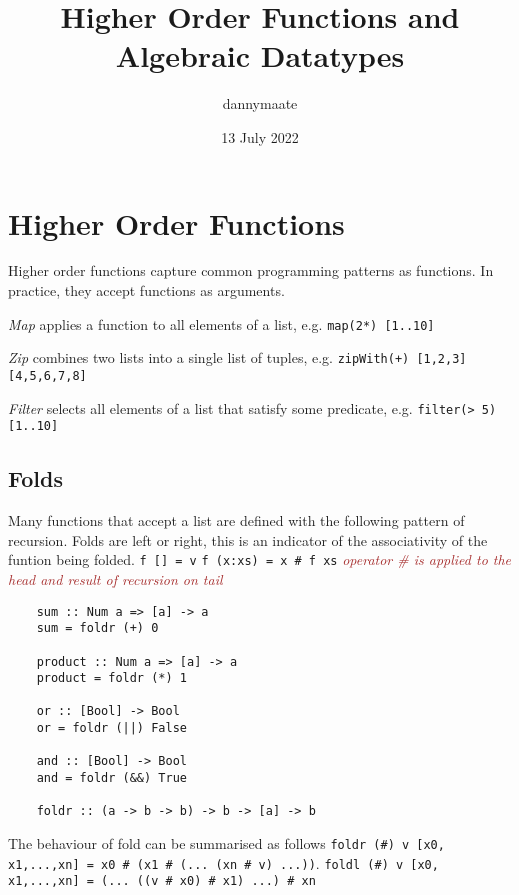 \documentclass{article}
\title{Higher Order Functions and Algebraic Datatypes}
\author{dannymaate}
\date{13 July 2022}
\begin{document}
\maketitle

\section{Higher Order Functions}
Higher order functions capture common programming patterns as functions. In practice, they accept functions as arguments. \newline

\noindent \textcolor{Rhodamine}{\emph{Map}} applies a function to all elements of a list, e.g. \texttt{map(2*) [1..10]}

\noindent \textcolor{Rhodamine}{\emph{Zip}} combines two lists into a single list of tuples, e.g. \texttt{zipWith(+) [1,2,3] [4,5,6,7,8]}

\noindent \textcolor{Rhodamine}{\emph{Filter}} selects all elements of a list that satisfy some predicate, e.g. \texttt{filter(> 5) [1..10]}

\subsection*{Folds}
Many functions that accept a list are defined with the following pattern of recursion. Folds are left or right, this is an indicator of the associativity of the funtion being folded. \newline
\texttt{f []        = v} \newline
\texttt{f (x:xs)    = x \# f xs} \emph{\textcolor{Brown}{operator \# is applied to the head and result of recursion on tail}}

\begin{verbatim}
    sum :: Num a => [a] -> a
    sum = foldr (+) 0

    product :: Num a => [a] -> a
    product = foldr (*) 1

    or :: [Bool] -> Bool
    or = foldr (||) False

    and :: [Bool] -> Bool
    and = foldr (&&) True

    foldr :: (a -> b -> b) -> b -> [a] -> b
\end{verbatim}
The behaviour of fold can be summarised as follows \newline \texttt{foldr (\#) v [x0, x1,...,xn] = x0 \# (x1 \# (... (xn \# v) ...))}. \newline
\texttt{foldl (\#) v [x0, x1,...,xn] = (... ((v \# x0) \# x1) ...) \# xn}
\end{document}

